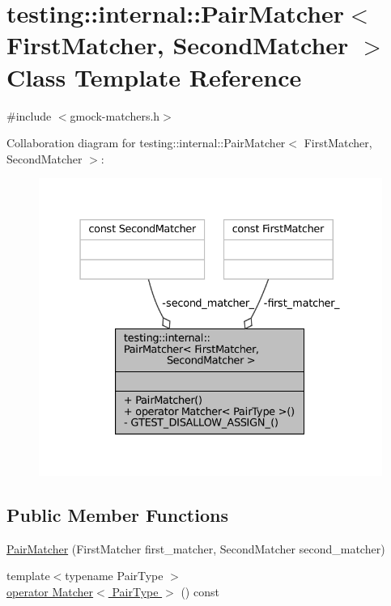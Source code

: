\hypertarget{classtesting_1_1internal_1_1PairMatcher}{}\section{testing\+:\+:internal\+:\+:Pair\+Matcher$<$ First\+Matcher, Second\+Matcher $>$ Class Template Reference}
\label{classtesting_1_1internal_1_1PairMatcher}


{\ttfamily \#include $<$gmock-\/matchers.\+h$>$}



Collaboration diagram for testing\+:\+:internal\+:\+:Pair\+Matcher$<$ First\+Matcher, Second\+Matcher $>$\+:
\nopagebreak
\begin{figure}[H]
\begin{center}
\leavevmode
\includegraphics[width=331pt]{classtesting_1_1internal_1_1PairMatcher__coll__graph}
\end{center}
\end{figure}
\subsection*{Public Member Functions}
\begin{DoxyCompactItemize}
\item 
\hyperlink{classtesting_1_1internal_1_1PairMatcher_a84f233a7d90ba33e3f0eb7410783c43c}{Pair\+Matcher} (First\+Matcher first\+\_\+matcher, Second\+Matcher second\+\_\+matcher)
\item 
{\footnotesize template$<$typename Pair\+Type $>$ }\\\hyperlink{classtesting_1_1internal_1_1PairMatcher_ae9461cc22148c6b15ad94eb5ad7c8a50}{operator Matcher$<$ Pair\+Type $>$} () const
\end{DoxyCompactItemize}

